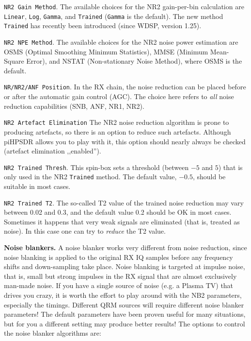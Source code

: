 \documentclass[12pt]{book}
\def\rett#1{\texttt{\color{red}#1}}
\def\pH{pi\-HPSDR }
\begin{document}
\rett{NR2 Gain Method}. The available choices for the NR2 gain-per-bin calculation
 are \rett{Linear},
 \rett{Log}, \rett{Gamma}, and \rett{Trained} (\rett{Gamma} is the default). The new method
 \rett{Trained} has recently been introduced (since WDSP, version 1.25).

\rett{NR2 NPE Method}. The available choices for the NR2 noise power estimation
are OSMS
(Optimal Smoothing Minimum Statistics), MMSE (Minimum Mean-Square Error), and
NSTAT (Non-stationary Noise Method),
where OSMS is the default.

\rett{NR/NR2/ANF Position}. In the RX chain, the noise reduction can be placed before or after
the automatic gain control (AGC). The choice here refers to \textit{all} noise reduction
capabilities (SNB, ANF, NR1, NR2).

\rett{NR2 Artefact Elimination} The NR2 noise reduction algorithm is prone to producing
artefacts, so there is an option to reduce such artefacts.
Although \pH allows you to play with it, this option should nearly always be
checked (artefact elimination ,,enabled'').

\rett{NR2 Trained Thresh}. This spin-box sets a threshold (between $-5$ and $5$)
that is only used in the NR2 \rett{Trained} method. The default value, $-0.5$, should be
suitable in most cases.

\rett{NR2 Trained T2}. The so-called T2 value of the trained noise reduction may vary between
0.02 and 0.3, and the default value 0.2 should be OK in most cases. Sometimes it happens that
very weak signals are eliminated (that is, treated as noise). In this case one can try to \textit{reduce} the
T2 value.


\textbf{Noise blankers.} A noise blanker works very different from  noise reduction, since noise blanking
is applied to the original RX IQ samples before any frequency shifts and down-sampling take place.
Noise blanking is targeted at impulse noise, that is, small but strong impulses in the RX
signal that are almost exclusively man-made noise.
If you have a single source of noise (e.g. a Plasma TV) that drives you crazy, it is worth
the effort to play around with the NB2 parameters, especially the timings. Different
QRM sources will require different noise blanker parameters! The default parameters have been proven useful
for many situations, but for you a different setting may produce better results!
The options to control the noise blanker algorithms are:
\end{document}
